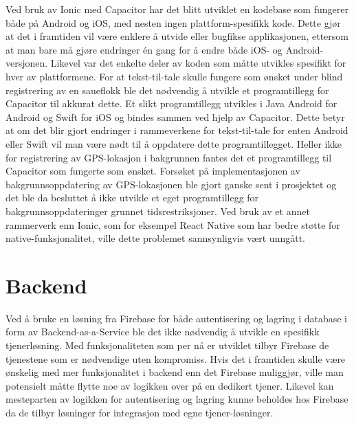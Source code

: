 \noindent
Ved bruk av Ionic med Capacitor har det blitt utviklet en kodebase som fungerer både på Android og iOS, med nesten ingen plattform-spesifikk kode. Dette gjør at det i framtiden vil være enklere å utvide eller bugfikse applikasjonen, ettersom at man bare må gjøre endringer én gang for å endre både iOS- og Android-versjonen. Likevel var det enkelte deler av koden som måtte utvikles spesifikt for hver av plattformene. For at tekst-til-tale skulle fungere som ønsket under blind registrering av en saueflokk ble det nødvendig å utvikle et programtillegg for Capacitor til akkurat dette. Et slikt programtillegg utvikles i Java Android for Android og Swift for iOS og bindes sammen ved hjelp av Capacitor. Dette betyr at om det blir gjort endringer i rammeverkene for tekst-til-tale for enten Android eller Swift vil man være nødt til å oppdatere dette programtillegget. Heller ikke for registrering av GPS-lokasjon i bakgrunnen fantes det et programtillegg til Capacitor som fungerte som ønsket. Forsøket på implementasjonen av bakgrunnsoppdatering av GPS-lokasjonen ble gjort ganske sent i prosjektet og det ble da besluttet å ikke utvikle et eget programtillegg for bakgrunnsoppdateringer grunnet tidsrestriksjoner. Ved bruk av et annet rammerverk enn Ionic, som for eksempel React Native som har bedre støtte for native-funksjonalitet, ville dette problemet sannsynligvis vært unngått.

\section{Backend}
Ved å bruke en løsning fra Firebase for både autentisering og lagring i database i form av Backend-as-a-Service ble det ikke nødvendig å utvikle en spesifikk tjenerløsning. Med funksjonaliteten som per nå er utviklet tilbyr Firebase de tjenestene som er nødvendige uten kompromiss. Hvis det i framtiden skulle være ønskelig med mer funksjonalitet i backend enn det Firebase muliggjør, ville man potensielt måtte flytte noe av logikken over på en dedikert tjener. Likevel kan mesteparten av logikken for autentisering og lagring kunne beholdes hos Firebase da de tilbyr løsninger for integrasjon med egne tjener-løsninger.